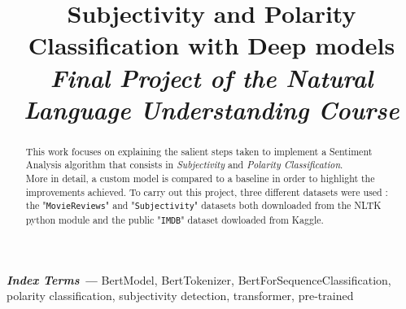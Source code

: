 \documentclass[a4paper, 10pt]{article}
\title{\LARGE{Subjectivity and Polarity Classification with Deep models}\\
\large{\textit{Final Project of the Natural Language Understanding Course}}}
\begin{document}
\maketitle

\begin{abstract}
    This work focuses on explaining the salient steps taken to implement a Sentiment Analysis algorithm that consists in \textit{Subjectivity} and \textit{Polarity Classification}.\\
    More in detail, a custom model is compared to a baseline in order to highlight the improvements achieved. To carry out this project, three different datasets were used : 
    the "\texttt{MovieReviews}" and  "\texttt{Subjectivity}" datasets both downloaded from the NLTK python module and the public "\texttt{IMDB}" dataset dowloaded from Kaggle\cite{kaggle}.\\
\end{abstract}


\textbf{\textit{Index Terms ---}} BertModel, BertTokenizer, BertForSequenceClassification, polarity classification, subjectivity detection, transformer,
pre-trained













\end{document}
